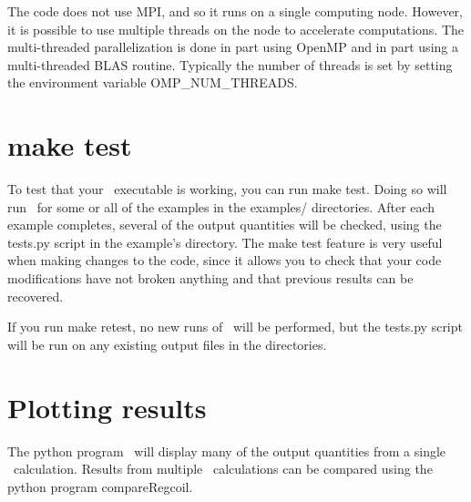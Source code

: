 The code does not use {\ttfamily MPI}, and so it runs on a single computing node.  However, it is possible to use multiple threads
on the node to accelerate computations.  The multi-threaded parallelization is done in part using {\ttfamily OpenMP}
and in part using a multi-threaded {\ttfamily BLAS} routine. Typically the number of threads is set by
setting the environment variable {\ttfamily OMP\_NUM\_THREADS}.


\section{\ttfamily make test}

To test that your \regcoil~executable is working, you can run {\ttfamily make test}.  Doing so will run
\regcoil~for some or all of the examples in the {\ttfamily examples/} directories.
After each example completes, several of the output quantities
will be checked, using the
{\ttfamily tests.py} script in the example's directory.
The {\ttfamily make test} feature is very useful when making changes to the code, since it allows you to check
that your code modifications have not broken anything and that previous results
can be recovered.

If you run {\ttfamily make retest},
no new runs of \regcoil~will be performed, but the {\ttfamily tests.py} script
will be run on any existing output files in the  directories.

\section{Plotting results}

The python program \regcoilPlot~will display many of the output quantities from a single \regcoil~calculation.
Results from multiple \regcoil~calculations can be compared using the python program {\ttfamily compareRegcoil}.

